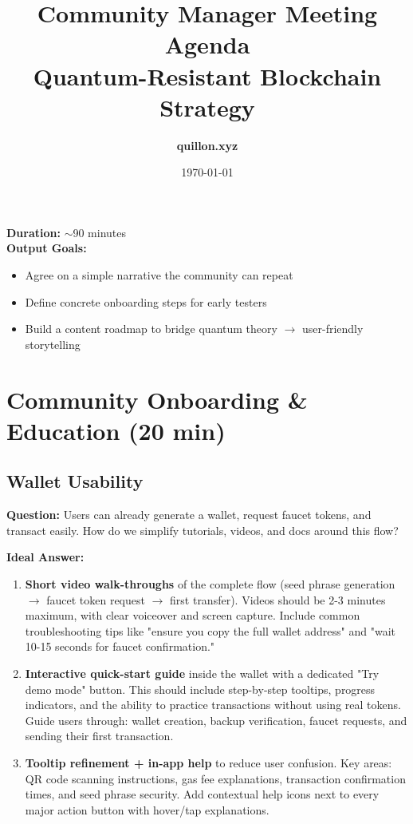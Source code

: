 \documentclass[11pt,a4paper]{article}
\begin{document}
\title{\textbf{\Huge Community Manager Meeting Agenda} \\
\Large \textcolor{quantumblue}{Quantum-Resistant Blockchain Strategy}}
\author{\textbf{quillon.xyz}}
\date{\today}
\maketitle

\vspace{-0.5cm}
\begin{center}
\textbf{Duration:} $\sim$90 minutes \\
\textbf{Output Goals:} \\
\begin{itemize}[itemsep=0pt]
\item Agree on a simple narrative the community can repeat
\item Define concrete onboarding steps for early testers
\item Build a content roadmap to bridge quantum theory $\rightarrow$ user-friendly storytelling
\end{itemize}
\end{center}

\section{Community Onboarding \& Education (20 min)}

\subsection{Wallet Usability}
\textbf{Question:} Users can already generate a wallet, request faucet tokens, and transact easily. How do we simplify tutorials, videos, and docs around this flow?

\textbf{Ideal Answer:}
\begin{enumerate}
\item \textbf{Short video walk-throughs} of the complete flow (seed phrase generation $\rightarrow$ faucet token request $\rightarrow$ first transfer). Videos should be 2-3 minutes maximum, with clear voiceover and screen capture. Include common troubleshooting tips like "ensure you copy the full wallet address" and "wait 10-15 seconds for faucet confirmation."

\item \textbf{Interactive quick-start guide} inside the wallet with a dedicated "Try demo mode" button. This should include step-by-step tooltips, progress indicators, and the ability to practice transactions without using real tokens. Guide users through: wallet creation, backup verification, faucet requests, and sending their first transaction.

\item \textbf{Tooltip refinement + in-app help} to reduce user confusion. Key areas: QR code scanning instructions, gas fee explanations, transaction confirmation times, and seed phrase security. Add contextual help icons next to every major action button with hover/tap explanations.
\end{enumerate}
\end{document}
